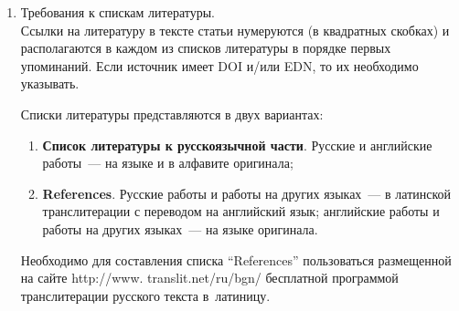{\begin{enumerate}[1.]
\begin{itemize}
{\sf http://www.ipiran.ru/journal/issues/2013\_07\_01\_eng/authors.asp};
\item аннотация (не менее 100~слов на каждом из языков). Аннотация~--- это краткое
резюме работы, которое может публиковаться отдельно. Она является основным
источником информации в~ин\-фор\-ма\-ци\-он\-ных системах и базах данных. Английская
аннотация должна быть оригинальной, может не быть дословным переводом русского
текста и должна быть написана хорошим английским языком. В~аннотации не должно
быть ссылок на литературу и, по возможности, формул;\\[-14.3pt]
\item ключевые слова~--- желательно из принятых в мировой
на\-уч\-но-тех\-ни\-че\-ской литературе тематических тезаурусов. Предложения не
могут быть ключевыми словами;\\[-14.3pt]
\item источники финансирования работы (ссылки на гранты, проекты,
поддерживающие организации и~т.\,п.).
\end{itemize}




\item  Требования к спискам литературы.\\[-13pt]

Ссылки на литературу в тексте статьи нумеруются (в квадратных скобках) и
располагаются в каждом из списков литературы в порядке  первых упоминаний. Если источник имеет DOI и/или EDN,
то их необходимо указывать.

Списки литературы представляются в двух вариантах:\\[-14pt]


\noindent
\begin{enumerate}[(1)]
\item \textbf{Список литературы к русскоязычной части}. Русские и английские
работы~---  на языке и в алфавите оригинала;\\[-14.5pt]
\item  \textbf{References}. Русские работы и работы на других языках~--- в латинской
транслитерации с переводом на английский язык; английские работы и работы на других
языках~--- на языке оригинала.
\end{enumerate}

Необходимо для составления списка ``References'' пользоваться размещенной на сайте
{\sf http://www. translit.net/ru/bgn/} бесплатной программой транслитерации русского
 текста в~латиницу. %


\end{enumerate}}
